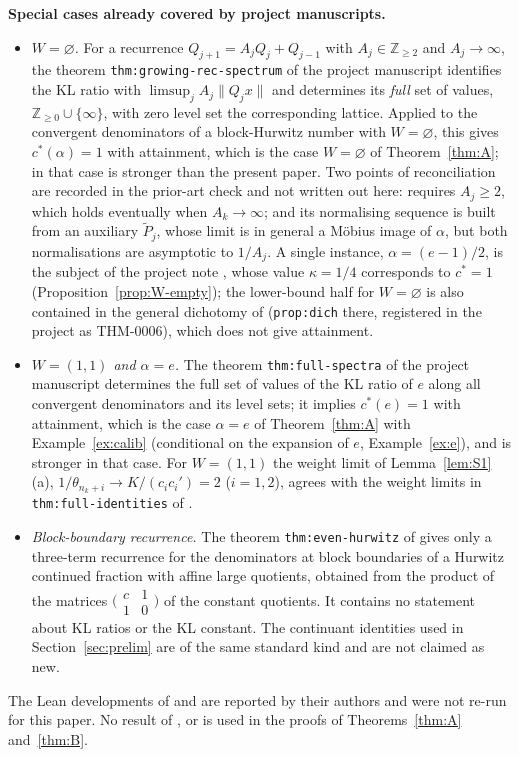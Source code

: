 \documentclass[11pt]{amsart}
\theoremstyle{definition}
\theoremstyle{remark}
\newcommand{\Z}{\mathbb{Z}}
\newcommand{\dist}[1]{\lVert #1\rVert}
\begin{document}
\medskip\noindent\textbf{Special cases already covered by project manuscripts.}
\begin{itemize}
\item \emph{$W=\varnothing$.} For a recurrence $Q_{j+1}=A_jQ_j+Q_{j-1}$ with $A_j\in\Z_{\ge2}$ and $A_j\to\infty$, the
theorem \texttt{thm:growing-rec-spectrum} of the project manuscript \cite{P2} identifies the KL ratio with
$\limsup_jA_j\dist{Q_jx}$ and determines its \emph{full} set of values, $\Z_{\ge0}\cup\{\infty\}$, with zero level set
the corresponding lattice. Applied to the convergent denominators of a block-Hurwitz number with $W=\varnothing$,
this gives $c^*(\alpha)=1$ with attainment, which is the case $W=\varnothing$ of Theorem~\ref{thm:A}; in that case
\cite{P2} is stronger than the present paper. Two points of reconciliation are recorded in the prior-art check
and not written out here: \cite{P2} requires $A_j\ge2$, which holds eventually when $A_k\to\infty$; and its
normalising sequence is built from an auxiliary $\tilde P_j$, whose limit is in general a M\"obius image of
$\alpha$, but both normalisations are asymptotic to $1/A_j$. A single instance, $\alpha=(e-1)/2$, is the subject of
the project note \cite{D5}, whose value $\kappa=1/4$ corresponds to $c^*=1$ (Proposition~\ref{prop:W-empty}); the
lower-bound half for $W=\varnothing$ is also contained in the general dichotomy of \cite{D5}
(\texttt{prop:dich} there, registered in the project as THM-0006), which does not give attainment.
\item \emph{$W=(1,1)$ and $\alpha=e$.} The theorem \texttt{thm:full-spectra} of the project manuscript \cite{P2E}
determines the full set of values of the KL ratio of $e$ along all convergent denominators and its level sets;
it implies $c^*(e)=1$ with attainment, which is the case $\alpha=e$ of Theorem~\ref{thm:A} with
Example~\ref{ex:calib} (conditional on the expansion of $e$, Example~\ref{ex:e}), and is stronger in that case. For $W=(1,1)$ the weight
limit of Lemma~\ref{lem:S1}(a), $1/\theta_{n_k+i}\to K/(c_ic_i')=2$ ($i=1,2$), agrees with the weight limits in
\texttt{thm:full-identities} of \cite{P2E}.
\item \emph{Block-boundary recurrence.} The theorem \texttt{thm:even-hurwitz} of \cite{P2E} gives only a
three-term recurrence for the denominators at block boundaries of a Hurwitz continued fraction with affine
large quotients, obtained from the product of the matrices $\bigl(\begin{smallmatrix}c&1\\1&0\end{smallmatrix}\bigr)$ of
the constant quotients. It contains no statement about KL ratios or the KL constant. The continuant identities
used in Section~\ref{sec:prelim} are of the same standard kind and are not claimed as new.
\end{itemize}
The Lean developments of \cite{P2} and \cite{P2E} are reported by their authors and were not re-run for
this paper. No result of \cite{P2}, \cite{P2E} or \cite{D5} is used in the proofs of
Theorems~\ref{thm:A} and~\ref{thm:B}.
\end{document}
